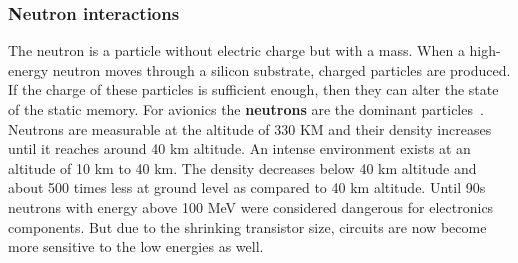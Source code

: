 \subsubsection{Neutron interactions}
The neutron is a particle without electric charge but with a mass. When a high-energy neutron moves through a silicon substrate, charged particles are produced. If the charge of these particles is sufficient enough, then they can alter the state of the static memory.  For avionics the \textbf{neutrons} are the dominant particles~\citep{xilinnseu}. Neutrons are measurable at the altitude of 330 KM and their density increases until it reaches around 40 km altitude. An intense environment exists at an altitude of 10 km to 40 km. The density decreases below 40 km altitude and about 500 times less at ground level as compared to 40 km altitude. Until 90s neutrons with energy above 100 MeV were considered dangerous for electronics components. But due to the shrinking transistor size, circuits are now become more sensitive to the low energies as well.   
